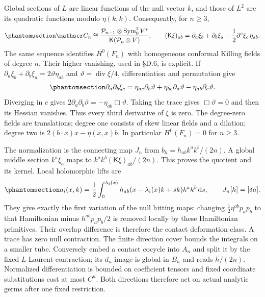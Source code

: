 \documentclass[
  english,
  11pt,
  reqno]{amsart}
\begin{document}
Global sections of \(L\) are linear functions of the null vector \(k\),
and those of \(L^2\) are its quadratic functions modulo \(\eta(k,k)\).
Consequently, for \(n\ge3\),
\begin{equation}\protect\phantomsection\label{eq:gg-contact-conformal-quotient}{
 \mathscr C_n\cong
 \frac{\mathcal P_{n-1}\otimes\operatorname{Sym}^2_0V^*}
      {\mathsf K(\mathcal P_n\otimes V)},\qquad
 (\mathsf K\xi)_{ab}
   =\partial_a\xi_b+\partial_b\xi_a
                      -\frac12\partial^c\xi_c\,\eta_{ab}.
}\end{equation} The same sequence identifies \(H^0(F_n)\) with
homogeneous conformal Killing fields of degree \(n\). Their higher
vanishing, used in §D.6, is explicit. If
\(\partial_a\xi_b+\partial_b\xi_a=2\vartheta\eta_{ab}\) and
\(\vartheta=\operatorname{div}\xi/4\), differentiation and permutation
give
\begin{equation}\protect\phantomsection\label{eq:gg-contact-killing-finite-type}{
 \partial_a\partial_b\xi_c
  =\eta_{ac}\partial_b\vartheta+\eta_{bc}\partial_a\vartheta
                                  -\eta_{ab}\partial_c\vartheta .
}\end{equation} Diverging in \(c\) gives
\(2\partial_a\partial_b\vartheta=-\eta_{ab}\Box\vartheta\). Taking the
trace gives \(\Box\vartheta=0\) and then its Hessian vanishes. Thus
every third derivative of \(\xi\) is zero. The degree-zero fields are
translations; degree one consists of skew linear fields and a dilation;
degree two is \(2(b\cdot x)x-\eta(x,x)b\). In particular \(H^0(F_n)=0\)
for \(n\ge3\).

The normalization is the connecting map \(J_n\) from
\(b_h=h_{ab}k^ak^b/(2n)\). A global middle section \(k^a\xi_a\) maps to
\(k^ak^b(\mathsf K\xi)_{ab}/(2n)\). This proves the quotient and its
kernel. Local holomorphic lifts are
\begin{equation}\protect\phantomsection\label{eq:gg-contact-metric-ray-primitive}{
 a_i(x,k)=\frac12\int_0^{\lambda_i(x)}
      h_{ab}(x-\lambda_i(x)k+sk)k^ak^b\,\mathrm ds,\qquad
 J_n[h]=[\delta a].
}\end{equation} They give exactly the first variation of the null
hitting maps: changing \(\frac12\eta^{ab}p_ap_b\) to that Hamiltonian
minus \(h^{ab}p_ap_b/2\) is removed locally by these Hamiltonian
primitives. Their overlap difference is therefore the contact
deformation class. A trace has zero null contraction. The finite
direction cover bounds the integrals on a smaller tube. Conversely embed
a contact cocycle into \(A_n\) and split it by the fixed \(L\) Laurent
contraction; its \(d_n\) image is global in \(B_n\) and reads
\(h/(2n)\). Normalized differentiation is bounded on coefficient tensors
and fixed coordinate substitutions cost at most \(C^n\). Both directions
therefore act on actual analytic germs after one fixed restriction.
\end{document}
